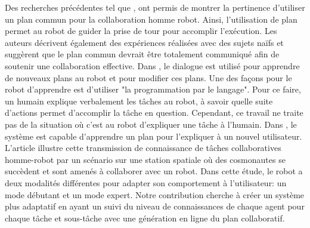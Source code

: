 \documentclass[a4paper,11pt,twoside]{StyleThese}
\begin{document}
Des recherches précédentes tel que \cite{Lallee2013}, ont permis de montrer la pertinence d'utiliser un plan commun pour la collaboration homme robot. Ainsi, l'utilisation de plan permet au robot de guider la prise de tour pour accomplir l'exécution. Les auteurs décrivent également des expériences réalisées avec des sujets naïfs et suggèrent que le plan commun devrait être totalement communiqué afin de soutenir une collaboration effective. Dans \cite{Petit2012}, le dialogue est utilisé pour apprendre de nouveaux plans au robot et pour modifier ces plans. Une des façons pour le robot d'apprendre est d'utiliser "la programmation par le langage". Pour ce faire, un humain explique verbalement les tâches au robot, à savoir quelle suite d'actions permet d'accomplir la tâche en question. Cependant, ce travail ne traite pas de la situation où c'est au robot d'expliquer une tâche à l'humain.
Dans \cite{Sorce2015}, le système est capable d'apprendre un plan pour l'expliquer à un nouvel utilisateur. L'article illustre cette transmission de connaissance de tâches collaboratives homme-robot par un scénario sur une station spatiale où des cosmonautes se succèdent et sont amenés à collaborer avec un robot. Dans cette étude, le robot a deux modalités différentes pour adapter son comportement à l'utilisateur: un mode débutant et un mode expert.
Notre contribution cherche à créer un système plus adaptatif en ayant un suivi du niveau de connaissances de chaque agent pour chaque tâche et sous-tâche avec une génération en ligne du plan collaboratif.


\end{document}
